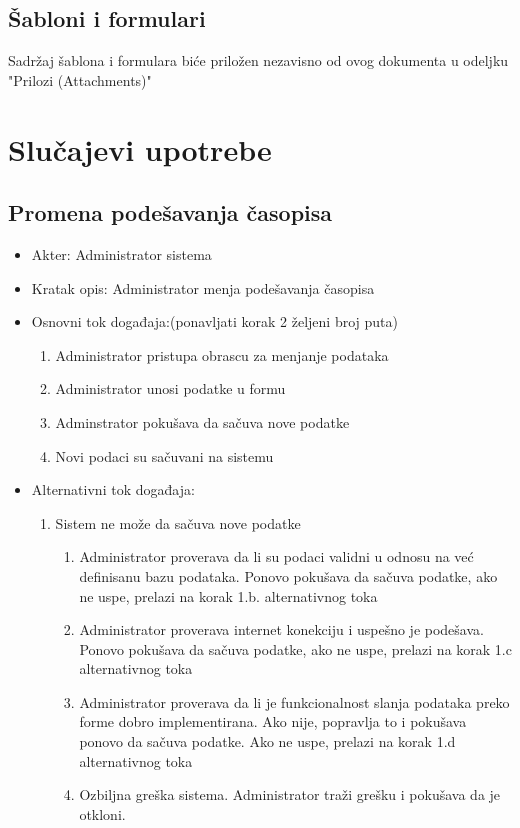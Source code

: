 \documentclass[a4paper]{article}
\begin{document}
\subsection{Šabloni i formulari}
Sadržaj šablona i formulara biće priložen nezavisno od ovog dokumenta u odeljku "Prilozi (Attachments)"

\section{Slučajevi upotrebe}

\subsection{Promena podešavanja časopisa}
\begin{itemize}
    \item Akter: Administrator sistema
    \item Kratak opis: Administrator menja podešavanja časopisa
    \item Osnovni tok događaja:(ponavljati korak 2 željeni broj puta)
        \begin{enumerate}
            \item Administrator pristupa obrascu za menjanje podataka
            \item Administrator unosi podatke u formu
            \item Adminstrator pokušava da sačuva nove podatke
            \item Novi podaci su sačuvani na sistemu
        \end{enumerate}
    \item Alternativni tok događaja:
        \begin{enumerate}
            \item Sistem ne može da sačuva nove podatke
                \begin{enumerate}
                    \item Administrator proverava da li su podaci validni u odnosu na već definisanu bazu podataka. Ponovo pokušava da sačuva podatke, ako ne uspe, prelazi na korak 1.b. alternativnog toka
                    \item Administrator proverava internet konekciju i uspešno je podešava. Ponovo pokušava da sačuva podatke, ako ne uspe, prelazi na korak 1.c alternativnog toka
                    \item Administrator proverava da li je funkcionalnost slanja podataka preko forme dobro implementirana. Ako nije, popravlja to i pokušava ponovo da sačuva podatke. Ako ne uspe, prelazi na korak 1.d alternativnog toka
                    \item Ozbiljna greška sistema. Administrator traži grešku i pokušava da je otkloni.
                \end{enumerate}
        \end{enumerate}
\end{itemize}
\end{document}
